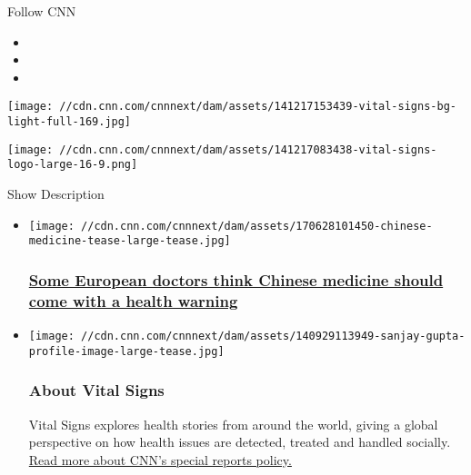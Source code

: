 Follow CNN

\begin{itemize}
\item
\item
\item
\end{itemize}

\texttt{[image: //cdn.cnn.com/cnnnext/dam/assets/141217153439-vital-signs-bg-light-full-169.jpg]}

\texttt{[image: //cdn.cnn.com/cnnnext/dam/assets/141217083438-vital-signs-logo-large-16-9.png]}

Show Description

\begin{itemize}
\item
  \href{/2019/11/16/health/traditional-chinese-medicine-facebook-intl-hnk-wellness/index.html}{}

  \texttt{[image: //cdn.cnn.com/cnnnext/dam/assets/170628101450-chinese-medicine-tease-large-tease.jpg]}

  \hypertarget{some-european-doctors-think-chinese-medicine-should-come-with-a-health-warning}{%
  \subsubsection{\texorpdfstring{\href{/2019/11/16/health/traditional-chinese-medicine-facebook-intl-hnk-wellness/index.html}{Some
  European doctors think Chinese medicine should come with a health
  warning}}{Some European doctors think Chinese medicine should come with a health warning}}\label{some-european-doctors-think-chinese-medicine-should-come-with-a-health-warning}}
\end{itemize}

\begin{itemize}
\item
  \texttt{[image: //cdn.cnn.com/cnnnext/dam/assets/140929113949-sanjay-gupta-profile-image-large-tease.jpg]}

  \hypertarget{about-vital-signs}{%
  \subsubsection{About Vital Signs}\label{about-vital-signs}}

  Vital Signs explores health stories from around the world, giving a
  global perspective on how health issues are detected, treated and
  handled socially.\\
  \href{/2015/01/02/world/sponsorships-policy/index.html}{Read more
  about CNN's special reports policy.}
\end{itemize}

